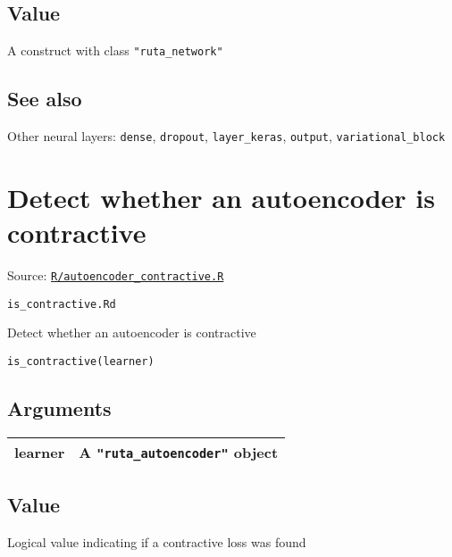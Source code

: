 \hypertarget{value}{\subsection{\texorpdfstring{\protect\hyperlink{value}{}Value}{Value}}\label{value}}

A construct with class \texttt{"ruta\_network"}

\hypertarget{see-also}{\subsection{\texorpdfstring{\protect\hyperlink{see-also}{}See
also}{See also}}\label{see-also}}

Other neural layers: \texttt{dense}, \texttt{dropout},
\texttt{layer\_keras}, \texttt{output}, \texttt{variational\_block}

\section{Detect whether an autoencoder is
contractive}\label{detect-whether-an-autoencoder-is-contractive}

Source:
\href{https://github.com/fdavidcl/ruta/blob/master/R/autoencoder_contractive.R}{\texttt{R/autoencoder\_contractive.R}}

\texttt{is\_contractive.Rd}

Detect whether an autoencoder is contractive

\begin{verbatim}
is_contractive(learner)
\end{verbatim}

\hypertarget{arguments}{\subsection{\texorpdfstring{\protect\hyperlink{arguments}{}Arguments}{Arguments}}\label{arguments}}

\begin{longtable}[c]{@{}ll@{}}
\toprule
learner & A \texttt{"ruta\_autoencoder"} object\tabularnewline
\bottomrule
\end{longtable}

\hypertarget{value}{\subsection{\texorpdfstring{\protect\hyperlink{value}{}Value}{Value}}\label{value}}

Logical value indicating if a contractive loss was found

